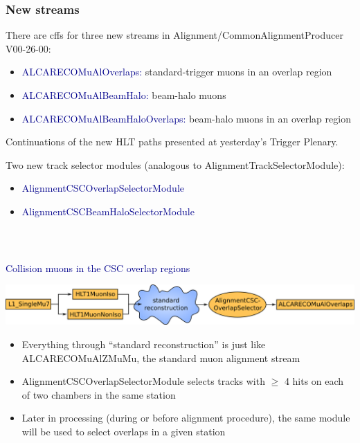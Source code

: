 \documentclass[compress]{beamer}
\begin{document}
\begin{frame}
\frametitle{New streams}

There are cffs for three new streams in Alignment/CommonAlignmentProducer V00-26-00:

\vspace{0.1 cm}
\begin{itemize}\setlength{\itemsep}{0.25 cm}
\item \textcolor{darkblue}{ALCARECOMuAlOverlaps:} standard-trigger muons in an overlap region
\item \textcolor{darkblue}{ALCARECOMuAlBeamHalo:} beam-halo muons
\item \textcolor{darkblue}{ALCARECOMuAlBeamHaloOverlaps:} beam-halo muons in an overlap region
\end{itemize}

\vfill
Continuations of the new HLT paths presented at yesterday's Trigger Plenary.

\vfill
Two new track selector modules (analogous to AlignmentTrackSelectorModule):
\begin{itemize}
\item \textcolor{darkblue}{AlignmentCSCOverlapSelectorModule}
\item \textcolor{darkblue}{AlignmentCSCBeamHaloSelectorModule}
\end{itemize}
\end{frame}

\begin{frame}
\frametitle{\mbox{ }}

\vfill
\hspace{-0.83 cm} \textcolor{darkblue}{\Large Collision muons in the CSC overlap regions}

\vspace{0.5 cm}
\includegraphics[width=\linewidth]{path_standard.png}

\begin{itemize}\setlength{\itemsep}{0.25 cm}
\item Everything through ``standard reconstruction'' is just like
ALCARECOMuAlZMuMu, the standard muon alignment stream

\item AlignmentCSCOverlapSelectorModule selects tracks with $\ge$ 4 hits
on each of two chambers in the same station

\item Later in processing (during or before alignment procedure), the
same module will be used to select overlaps in a given station

\end{itemize}
\end{frame}
\end{document}

